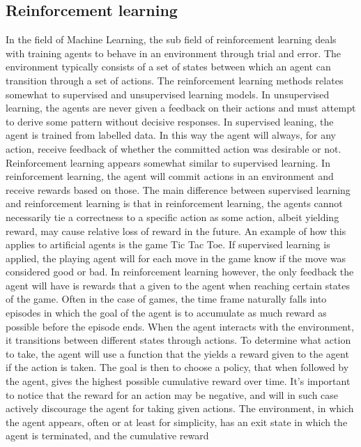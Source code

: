 \subsection{Reinforcement learning \label{RL}}

In the field of Machine Learning, the sub field of reinforcement learning
deals with training agents to behave in an environment through
trial and error. The environment typically consists of a set of states
between which an agent can transition through a set of actions.
The reinforcement learning methods relates somewhat 
to supervised and unsupervised learning models. In unsupervised 
learning, the agents are never given a feedback on their actions
and must attempt to derive some pattern without decisive responses.
In supervised leaning, the agent is trained from labelled data.
In this way the agent will always, for any action, receive 
feedback of whether the committed action was desirable or not.
Reinforcement learning appears somewhat similar to supervised learning.
In reinforcement learning, the agent will commit actions in an environment
and receive rewards based on those. The main difference between supervised
learning and reinforcement learning is that in reinforcement learning,
the agents cannot necessarily tie a correctness 
to a specific action as some action, albeit yielding reward,
may cause relative loss of reward in the future. An example of how this applies 
to artificial agents is the game Tic Tac Toe. If supervised learning
is applied, the playing agent will for each move in the game know
if the move was considered good or bad. In reinforcement learning however,
the only feedback the agent will have is rewards that a given 
to the agent when reaching certain states of the game. 
Often in the case of games, the 
time frame naturally falls into episodes in which the 
goal of the agent is to accumulate as much reward as possible 
before the episode ends. When the agent interacts 
with the environment, it transitions between different states through 
actions. To determine what action to take, the agent will use
a function that the yields a reward given to the agent 
if the action is taken. 
The goal is then to choose a policy, that when followed by the agent,
gives the highest possible cumulative reward over time. 
It's important to notice that the reward 
for an action may be negative, and will in such case actively discourage 
the agent for taking given actions.
The environment, in which the agent appears, often 
or at least for simplicity, has an exit state
in which the agent is terminated, and the cumulative reward 
